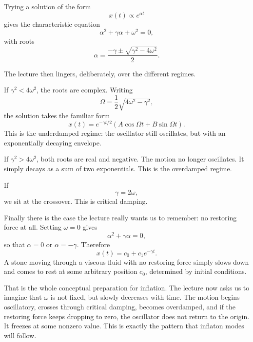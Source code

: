 Trying a solution of the form
\begin{equation}
x(t)\propto e^{\alpha t}
\end{equation}
gives the characteristic equation
\begin{equation}
\alpha^{2}+\gamma\alpha+\omega^{2}=0,
\end{equation}
with roots
\begin{equation}
\alpha=\frac{-\gamma\pm\sqrt{\gamma^{2}-4\omega^{2}}}{2}.
\end{equation}

The lecture then lingers, deliberately, over the different regimes.

If \(\gamma^{2}<4\omega^{2}\), the roots are complex. Writing
\begin{equation}
\Omega=\frac12\sqrt{4\omega^{2}-\gamma^{2}},
\end{equation}
the solution takes the familiar form
\begin{equation}
x(t)=e^{-\gamma t/2}\left(A\cos \Omega t+B\sin \Omega t\right).
\end{equation}
This is the underdamped regime: the oscillator still oscillates, but with an exponentially decaying envelope.

If \(\gamma^{2}>4\omega^{2}\), both roots are real and negative. The motion no longer oscillates. It simply decays as a sum of two exponentials. This is the overdamped regime.

If
\begin{equation}
\gamma=2\omega,
\end{equation}
we sit at the crossover. This is critical damping.

Finally there is the case the lecture really wants us to remember: no restoring force at all. Setting \(\omega=0\) gives
\begin{equation}
\alpha^{2}+\gamma\alpha=0,
\end{equation}
so that \(\alpha=0\) or \(\alpha=-\gamma\). Therefore
\begin{equation}
x(t)=c_{0}+c_{1}e^{-\gamma t}.
\end{equation}
A stone moving through a viscous fluid with no restoring force simply slows down and comes to rest at some arbitrary position \(c_{0}\), determined by initial conditions.

That is the whole conceptual preparation for inflation. The lecture now asks us to imagine that \(\omega\) is not fixed, but slowly decreases with time. The motion begins oscillatory, crosses through critical damping, becomes overdamped, and if the restoring force keeps dropping to zero, the oscillator does not return to the origin. It freezes at some nonzero value. This is exactly the pattern that inflaton modes will follow.

